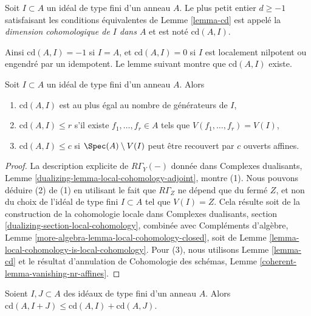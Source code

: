 \begin{definition}
\label{definition-cd}
Soit $I \subset A$ un idéal de type fini d'un anneau $A$.
Le plus petit entier $d \geq -1$ satisfaisant les conditions équivalentes
de Lemme \ref{lemma-cd} est appelé la
{\it dimension cohomologique de $I$ dans $A$} et est
noté $\text{cd}(A, I)$.
\end{definition}

\noindent
Ainsi $\text{cd}(A, I) = -1$ si
$I = A$, et $\text{cd}(A, I) = 0$ si $I$ est localement nilpotent
ou engendré par un idempotent.
Le lemme suivant montre que $\text{cd}(A, I)$ existe.

\begin{lemma}
\label{lemma-bound-cd}
Soit $I \subset A$ un idéal de type fini d'un anneau $A$.
Alors
\begin{enumerate}
\item $\text{cd}(A, I)$ est au plus égal au nombre de
générateurs de $I$,
\item $\text{cd}(A, I) \leq r$ s'il existe $f_1, \ldots, f_r \in A$
tels que $V(f_1, \ldots, f_r) = V(I)$,
\item $\text{cd}(A, I) \leq c$ si $\Spec(A) \setminus V(I)$
peut être recouvert par $c$ ouverts affines.
\end{enumerate}
\end{lemma}

\begin{proof}
La description explicite de $R\Gamma_Y(-)$ donnée dans
Complexes dualisants, Lemme \ref{dualizing-lemma-local-cohomology-adjoint},
montre (1). Nous pouvons déduire (2) de (1) en utilisant le
fait que $R\Gamma_Z$ ne dépend que du fermé
$Z$, et non du choix de l'idéal de type fini
$I \subset A$ tel que $V(I) = Z$. Cela résulte soit de la
construction de la cohomologie locale dans
Complexes dualisants, section \ref{dualizing-section-local-cohomology},
combinée avec
Compléments d'algèbre, Lemme \ref{more-algebra-lemma-local-cohomology-closed},
soit de Lemme \ref{lemma-local-cohomology-is-local-cohomology}.
Pour (3), nous utilisons Lemme \ref{lemma-cd}
et le résultat d'annulation de Cohomologie des schémas, Lemme
\ref{coherent-lemma-vanishing-nr-affines}.
\end{proof}

\begin{lemma}
\label{lemma-cd-sum}
Soient $I, J \subset A$ des idéaux de type fini d'un anneau $A$.
Alors $\text{cd}(A, I + J) \leq \text{cd}(A, I) + \text{cd}(A, J)$.
\end{lemma}

